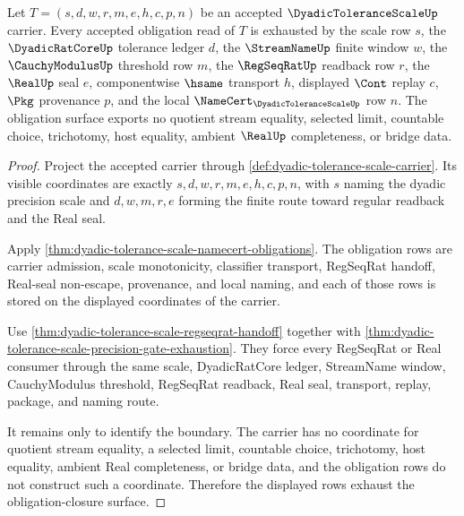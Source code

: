 \begin{theorem}
\label{thm:dyadic-tolerance-scale-obligation-closure-scope}
Let $T=(s,d,w,r,m,e,h,c,p,n)$ be an accepted $\DyadicToleranceScaleUp$ carrier. Every accepted obligation read of $T$ is exhausted by the scale row $s$, the $\DyadicRatCoreUp$ tolerance ledger $d$, the $\StreamNameUp$ finite window $w$, the $\CauchyModulusUp$ threshold row $m$, the $\RegSeqRatUp$ readback row $r$, the $\RealUp$ seal $e$, componentwise $\hsame$ transport $h$, displayed $\Cont$ replay $c$, $\Pkg$ provenance $p$, and the local $\NameCert_{\DyadicToleranceScaleUp}$ row $n$. The obligation surface exports no quotient stream equality, selected limit, countable choice, trichotomy, host equality, ambient $\RealUp$ completeness, or bridge data.
\end{theorem}
\begin{proof}
Project the accepted carrier through \autoref{def:dyadic-tolerance-scale-carrier}. Its visible coordinates are exactly $s,d,w,r,m,e,h,c,p,n$, with $s$ naming the dyadic precision scale and $d,w,m,r,e$ forming the finite route toward regular readback and the Real seal.

Apply \autoref{thm:dyadic-tolerance-scale-namecert-obligations}. The obligation rows are carrier admission, scale monotonicity, classifier transport, RegSeqRat handoff, Real-seal non-escape, provenance, and local naming, and each of those rows is stored on the displayed coordinates of the carrier.

Use \autoref{thm:dyadic-tolerance-scale-regseqrat-handoff} together with \autoref{thm:dyadic-tolerance-scale-precision-gate-exhaustion}. They force every RegSeqRat or Real consumer through the same scale, DyadicRatCore ledger, StreamName window, CauchyModulus threshold, RegSeqRat readback, Real seal, transport, replay, package, and naming route.

It remains only to identify the boundary. The carrier has no coordinate for quotient stream equality, a selected limit, countable choice, trichotomy, host equality, ambient Real completeness, or bridge data, and the obligation rows do not construct such a coordinate. Therefore the displayed rows exhaust the obligation-closure surface.
\end{proof}

